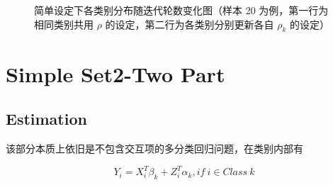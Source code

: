 \documentclass[12pt, a4paper, oneside]{article}
\numberwithin{equation}{section}
\begin{document}
\begin{figure}
{\begin{minipage}[t]{0.33\linewidth}
		\vspace{0.02cm}
	\end{minipage}%
	}%
	\centering
	\caption{简单设定下各类别分布随迭代轮数变化图（样本 20 为例，第一行为相同类别共用 $\rho$ 的设定，第二行为各类别分别更新各自 $\rho_k$ 的设定）}
	\vspace{-0.2cm}
	\label{fig:simple-vis}
\end{figure}




\section{Simple Set2-Two Part}

\subsection{Estimation}

该部分本质上依旧是不包含交互项的多分类回归问题，在类别内部有

\begin{equation}
	Y_i = X_i^T\beta_k + Z_i^T\alpha_k, if\ i\in Class\ k
\end{equation}
\end{document}
